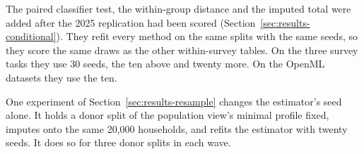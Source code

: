 The paired classifier test, the within-group distance and the imputed total
were added after the 2025 replication had been scored
(Section~\ref{sec:results-conditional}). They refit every method on the same
splits with the same seeds, so they score the same draws as the other
within-survey tables. On the three survey tasks they use 30 seeds, the ten
above and twenty more. On the OpenML datasets they use the ten.

One experiment of Section~\ref{sec:results-resample} changes the estimator's
seed alone. It holds a donor split of the population view's minimal profile
fixed, imputes onto the same 20,000 \cps{} households, and refits the
estimator with twenty seeds. It does so for three donor splits in each
wave.
